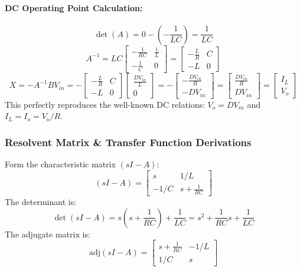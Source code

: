 \paragraph{DC Operating Point Calculation:}
\begin{equation}
\det(A) = 0 - \left(-\frac{1}{LC}\right) = \frac{1}{LC}
\end{equation}
\begin{equation}
A^{-1} = L C \begin{bmatrix} -\frac{1}{RC} & \frac{1}{L} \\ -\frac{1}{C} & 0 \end{bmatrix} = \begin{bmatrix} -\frac{L}{R} & C \\ -L & 0 \end{bmatrix}
\end{equation}
\begin{equation}
X = -A^{-1} B V_{in} = -\begin{bmatrix} -\frac{L}{R} & C \\ -L & 0 \end{bmatrix} \begin{bmatrix} \frac{D V_{in}}{L} \\ 0 \end{bmatrix} = -\begin{bmatrix} -\frac{D V_{in}}{R} \\ -D V_{in} \end{bmatrix} = \begin{bmatrix} \frac{D V_{in}}{R} \\ D V_{in} \end{bmatrix} = \begin{bmatrix} I_L \\ V_o \end{bmatrix}
\end{equation}
This perfectly reproduces the well-known DC relations: $V_o = D V_{in}$ and $I_L = I_o = V_o / R$.

\subsubsection{Resolvent Matrix \& Transfer Function Derivations}
Form the characteristic matrix $(s I - A)$:
\begin{equation}
(s I - A) = \begin{bmatrix} s & 1/L \\ -1/C & s + \frac{1}{RC} \end{bmatrix}
\end{equation}
The determinant is:
\begin{equation}
\det(s I - A) = s\left(s + \frac{1}{RC}\right) + \frac{1}{LC} = s^2 + \frac{1}{RC} s + \frac{1}{LC}
\end{equation}
The adjugate matrix is:
\begin{equation}
\text{adj}(s I - A) = \begin{bmatrix} s + \frac{1}{RC} & -1/L \\ 1/C & s \end{bmatrix}
\end{equation}

